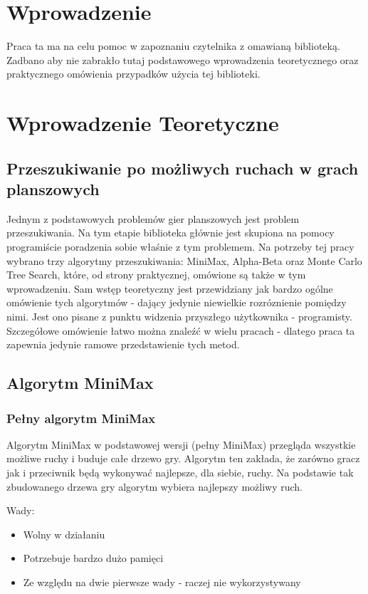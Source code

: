 \documentclass[declaration,shortabstract,inz]{iithesis}
\author         {Mikołaj Kowalik}
\begin{document}

\chapter{Wprowadzenie}
Praca ta ma na celu pomoc w zapoznaniu czytelnika z omawianą biblioteką.
Zadbano aby nie zabrakło tutaj podstawowego wprowadzenia teoretycznego oraz praktycznego omówienia przypadków użycia tej biblioteki.

\chapter{Wprowadzenie Teoretyczne}
\section{Przeszukiwanie po możliwych ruchach w grach planszowych}
Jednym z podstawowych problemów gier planszowych jest problem przeszukiwania.
Na tym etapie biblioteka głównie jest skupiona na pomocy programiście poradzenia sobie właśnie z tym problemem.
Na potrzeby tej pracy wybrano trzy algorytmy przeszukiwania: MiniMax, Alpha-Beta oraz Monte Carlo Tree Search, które, od strony praktycznej, omówione są także w tym wprowadzeniu.
Sam wstęp teoretyczny jest przewidziany jak bardzo ogólne omówienie tych algorytmów - dający jedynie niewielkie rozróznienie pomiędzy nimi. Jest ono pisane z punktu widzenia przyszłego użytkownika - programisty.
Szczegółowe omówienie łatwo można znaleźć w wielu pracach - dlatego praca ta zapewnia jedynie ramowe przedstawienie tych metod.
\section{Algorytm MiniMax}
\subsection{Pełny algorytm MiniMax}
Algorytm MiniMax w podstawowej wersji (pełny MiniMax) przegląda wszystkie możliwe ruchy i buduje całe drzewo gry.
Algorytm ten zakłada, że zarówno gracz jak i przeciwnik będą wykonywać najlepsze, dla siebie, ruchy.
Na podstawie tak zbudowanego drzewa gry algorytm wybiera najlepszy możliwy ruch.

Wady:
\begin{itemize}
  \item Wolny w działaniu
  \item Potrzebuje bardzo dużo pamięci
  \item Ze względu na dwie pierwsze wady - raczej nie wykorzystywany
\end{itemize}
\end{document}
